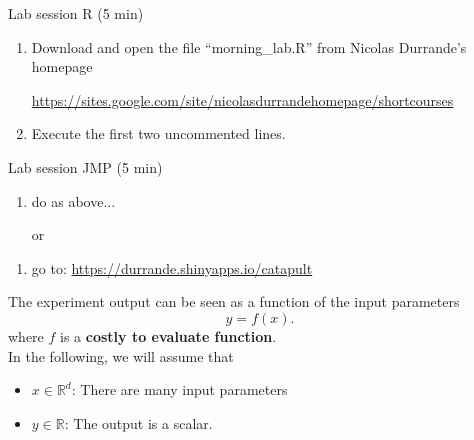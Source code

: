 \documentclass{beamer}
\begin{document}
\begin{frame}{}
\begin{exampleblock}{Lab session R (5 min)}
	\begin{enumerate}
		\item Download and open the file ``morning\_lab.R'' from Nicolas Durrande's homepage
		\begin{center}
			{\scriptsize \url{https://sites.google.com/site/nicolasdurrandehomepage/shortcourses}}
		\end{center} 
		
		\item Execute the first two uncommented lines. %
	\end{enumerate}
\end{exampleblock}
\bigskip
\begin{exampleblock}{Lab session JMP (5 min)}
	\begin{enumerate}
		\item do as above... 
	\end{enumerate}
	\begin{itemize}
		\item[or]
	\end{itemize}
	\begin{enumerate}
		\item go to: \url{https://durrande.shinyapps.io/catapult} 
	\end{enumerate}
\end{exampleblock}

\end{frame}

\begin{frame}{}
The experiment output can be seen as a function of the input parameters
$$ y = f(x). $$
where $f$ is a \textbf{costly to evaluate function}. \\
\vspace{5mm}
In the following, we will assume that 
\begin{itemize}
	\item $x \in \mathds{R}^d$: There are many input parameters
	\item $y \in \mathds{R}$: The output is a scalar.
\end{itemize}
\end{frame}
\end{document}
